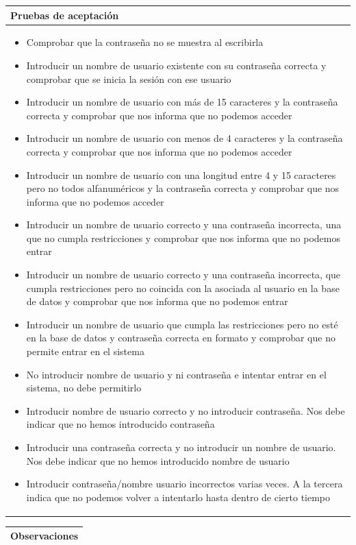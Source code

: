 \documentclass[11pt]{article}
\begin{document}
\begin{table}[H]
  \begin{tabular}{p{1.028\linewidth}}
    \textbf{Pruebas de aceptación}\\
  \midrule
  \begin{itemize}
  \item Comprobar que la contraseña no se muestra al escribirla
  \item Introducir un nombre de usuario existente con su contraseña correcta y comprobar que se inicia la sesión con ese usuario
  \item Introducir un nombre de usuario con más de 15 caracteres y la contraseña correcta y comprobar que nos informa que no podemos acceder
  \item Introducir un nombre de usuario con menos de 4 caracteres y la contraseña correcta y comprobar que nos informa que no podemos acceder
  \item Introducir un nombre de usuario con una longitud entre 4 y 15 caracteres pero no todos alfanuméricos y la contraseña correcta y comprobar que nos informa que no podemos acceder
  \item Introducir un nombre de usuario correcto y una contraseña incorrecta, una que no cumpla restricciones y comprobar que nos informa que no podemos entrar
  \item Introducir un nombre de usuario correcto y una contraseña incorrecta, que cumpla restricciones pero no coincida con la asociada al usuario en la base de datos y comprobar que nos informa que no podemos entrar
  \item Introducir un nombre de usuario que cumpla las restricciones pero no esté en la base de datos y contraseña correcta en formato y comprobar que no permite entrar en el sistema
  \item No introducir nombre de usuario y ni contraseña e intentar entrar en el sistema, no debe permitirlo
  \item Introducir nombre de usuario correcto y no introducir contraseña. Nos debe indicar que no hemos introducido contraseña
  \item Introducir una contraseña correcta y no introducir un nombre de usuario. Nos debe indicar que no hemos introducido nombre de usuario
  \item Introducir contraseña/nombre usuario incorrectos varias veces. A la tercera indica que no podemos volver a intentarlo hasta dentro de cierto tiempo
  
  \end{itemize}
\end{tabular}
\begin{tabular}{p{1.028\linewidth}}
  \textbf{Observaciones}\\
  \midrule
\end{tabular}
\end{table}
\end{document}

